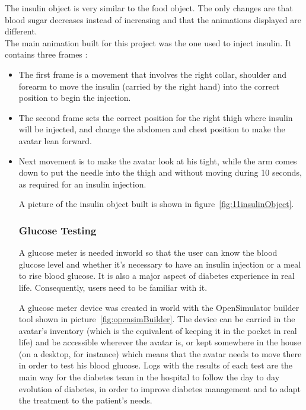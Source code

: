 {The insulin object is very similar to the food object. The only changes are that blood sugar decreases instead of increasing and that the animations displayed are different.\\
The main animation built for this project was the one used to inject insulin. It contains three frames :
\begin{itemize} 
\item The first frame is a movement that involves the right collar, shoulder and forearm to move the insulin (carried by the right hand) into the correct position to begin the injection. 
\item The second frame sets the correct position for the right thigh where insulin will be injected, and change the abdomen and chest position to make the avatar lean forward. \item Next movement is to make the avatar look at his tight, while the arm comes down to put the needle into the thigh and without moving during 10 seconds, as required for an insulin injection.
\begin{itemize}

A picture of the insulin object built is shown in figure~\ref{fig:11insulinObject}.





	\subsubsection{Glucose Testing}

A glucose meter is needed inworld so that the user can know the blood glucose level and whether it's necessary to have an insulin injection or a meal to rise blood glucose. It is also a major aspect of diabetes experience in real life. Consequently, users need to be familiar with it.

A glucose meter device was created in world with the OpenSimulator builder tool shown in picture~\ref{fig:opensimBuilder}. The device can be carried in the avatar's inventory 
(which is the equivalent of keeping it in the pocket in real life) and be accessible wherever the avatar is, 
or kept somewhere in the house (on a desktop, for instance) which means that the avatar needs to move there in order to test his blood glucose. 
Logs with the results of each test are the main way for the diabetes team in the hospital to follow the day to day evolution of diabetes, in order to improve diabetes management and to adapt the treatment to the patient's needs. \\


\end{itemize}
\end{itemize}}
